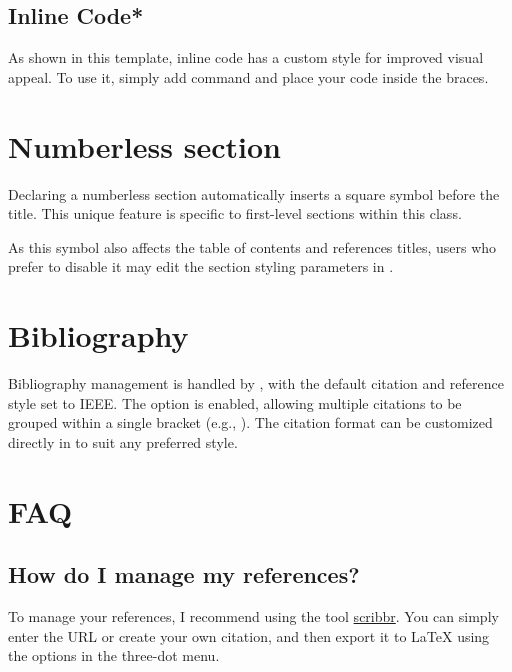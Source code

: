\documentclass[9pt,a4paper,twocolumn,twoside]{rho-class/rho}
\begin{document}
	\subsection{Inline Code*}
	
		As shown in this template, inline code has a custom style for improved visual appeal. To use it, simply add \inlinecode{\inlinecode{}} command and place your code inside the braces.

\section*{Numberless section}

    Declaring a numberless section automatically inserts a square symbol before the title. This unique feature is specific to first-level sections within this class.
    
    As this symbol also affects the table of contents and references titles, users who prefer to disable it may edit the section styling parameters in .

\section{Bibliography}
		
	Bibliography management is handled by , with the default citation and reference style set to IEEE. The  option is enabled, allowing multiple citations to be grouped within a single bracket (e.g., \cite{davis2023signalflow,bell2022codefont}). The citation format can be customized directly in  to suit any preferred style.

\section*{FAQ}

    \subsection*{How do I manage my references?}
        
        To manage your references, I recommend using the tool \href{https://www.scribbr.es/citar/generador/folders/73QOXYsCwMRu4ifQaN65mx/lists/msTfx7GJjIAOUkufbISnA/}{scribbr}. You can simply enter the URL or create your own citation, and then export it to \LaTeX{} using the options in the three-dot menu.
            
\end{document}
